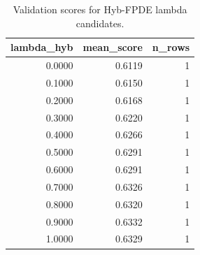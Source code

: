 \begin{table}[t]
\caption{Validation scores for Hyb-FPDE lambda candidates.}
\label{tab:lambda_distribution_computed}
\centering
\begin{tabular}{rrr}
\toprule
lambda\_hyb & mean\_score & n\_rows \\
\midrule
0.0000 & 0.6119 & 1 \\
0.1000 & 0.6150 & 1 \\
0.2000 & 0.6168 & 1 \\
0.3000 & 0.6220 & 1 \\
0.4000 & 0.6266 & 1 \\
0.5000 & 0.6291 & 1 \\
0.6000 & 0.6291 & 1 \\
0.7000 & 0.6326 & 1 \\
0.8000 & 0.6320 & 1 \\
0.9000 & 0.6332 & 1 \\
1.0000 & 0.6329 & 1 \\
\bottomrule
\end{tabular}

\end{table}
